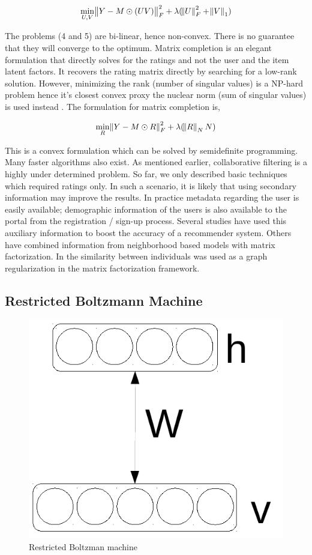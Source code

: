 \documentclass[conference]{IEEEtran}
\begin{document}
\begin{equation}
  \min_{U,V} \norm{Y-M \odot (UV)}^2_F + \lambda (\norm{U}^2_F+\norm{V}_1)
\end{equation}

The problems (4 and 5) are bi-linear, hence non-convex. There is no guarantee that they will converge to the optimum. Matrix completion is an elegant formulation that directly solves for the ratings and not the user and the item latent factors. It recovers the rating matrix directly by searching for
a low-rank solution. However, minimizing the rank (number of singular values) is a NP-hard problem hence it's closest convex proxy the nuclear norm (sum of singular values) is used instead \cite{Candes,Recht}. The formulation for matrix completion is,

\begin{equation}
  \min_{R} \norm{Y-M \odot R}^2_F + \lambda (\norm{R}_NN)
\end{equation}

This is a convex formulation which can be solved by semidefinite programming. Many faster algorithms also exist. 
As mentioned earlier, collaborative filtering is a highly under determined problem. So far, we only described basic techniques which required ratings only. In such a scenario, it is likely that using secondary information may improve the results. In practice metadata regarding the user is easily available; demographic information of the users is also available to the portal from the registration / sign-up process. Several studies \cite{Gogna3,Gu} have used this auxiliary information to boost the accuracy of a recommender system. Others have combined information from neighborhood based models with matrix factorization. In \cite{pmlr-v9-sutskever10a} the similarity between individuals was used as a graph regularization in the matrix factorization framework.

  \subsection{Restricted Boltzmann Machine}

  \begin{figure}
    \centering
      \includegraphics[width=0.2\linewidth]{rbm1}
        \caption{Restricted Boltzman machine}
        \label{fig:3}
  \end{figure}
\end{document}
